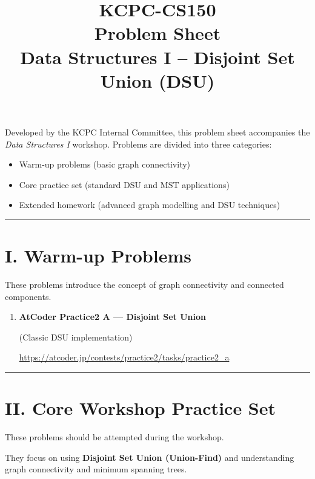 \documentclass[11pt]{article}
\title{KCPC-CS150 \\ Problem Sheet \\ Data Structures I – Disjoint Set Union (DSU)}
\author{}
\date{}
\begin{document}
\maketitle

\noindent
Developed by the KCPC Internal Committee, this problem sheet accompanies the \textit{Data Structures I} workshop.  
Problems are divided into three categories:

\begin{itemize}
    \item Warm-up problems (basic graph connectivity)
    \item Core practice set (standard DSU and MST applications)
    \item Extended homework (advanced graph modelling and DSU techniques)
\end{itemize}

\hrule
\vspace{1em}

\section*{I. Warm-up Problems}

These problems introduce the concept of graph connectivity and connected components.

\begin{enumerate}

\item \textbf{AtCoder Practice2 A — Disjoint Set Union}

(Classic DSU implementation)

\vspace{0.3em}
{\url{https://atcoder.jp/contests/practice2/tasks/practice2_a}}

\end{enumerate}

\vspace{1em}
\hrule
\vspace{1em}

\section*{II. Core Workshop Practice Set}

These problems should be attempted during the workshop.

They focus on using \textbf{Disjoint Set Union (Union-Find)} and understanding graph connectivity and minimum spanning trees.
\end{document}
